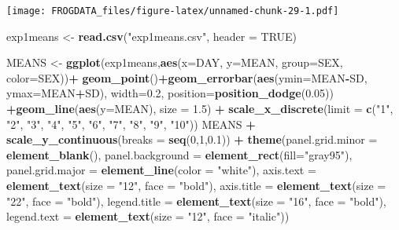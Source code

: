 \documentclass[]{article}
\newenvironment{Shaded}{\begin{snugshade}}{\end{snugshade}}
\newcommand{\KeywordTok}[1]{\textcolor[rgb]{0.13,0.29,0.53}{\textbf{#1}}}
\newcommand{\DataTypeTok}[1]{\textcolor[rgb]{0.13,0.29,0.53}{#1}}
\newcommand{\DecValTok}[1]{\textcolor[rgb]{0.00,0.00,0.81}{#1}}
\newcommand{\FloatTok}[1]{\textcolor[rgb]{0.00,0.00,0.81}{#1}}
\newcommand{\StringTok}[1]{\textcolor[rgb]{0.31,0.60,0.02}{#1}}
\newcommand{\OtherTok}[1]{\textcolor[rgb]{0.56,0.35,0.01}{#1}}
\newcommand{\OperatorTok}[1]{\textcolor[rgb]{0.81,0.36,0.00}{\textbf{#1}}}
\newcommand{\NormalTok}[1]{#1}
\begin{document}
\texttt{[image: FROGDATA\_files/figure-latex/unnamed-chunk-29-1.pdf]}

\begin{Shaded}
\begin{Highlighting}[]
\NormalTok{exp1means <-}\StringTok{ }\KeywordTok{read.csv}\NormalTok{(}\StringTok{"exp1means.csv"}\NormalTok{, }\DataTypeTok{header =} \OtherTok{TRUE}\NormalTok{)}

\NormalTok{MEANS <-}\StringTok{ }\KeywordTok{ggplot}\NormalTok{(exp1means,}\KeywordTok{aes}\NormalTok{(}\DataTypeTok{x=}\NormalTok{DAY, }\DataTypeTok{y=}\NormalTok{MEAN, }\DataTypeTok{group=}\NormalTok{SEX, }\DataTypeTok{color=}\NormalTok{SEX))}\OperatorTok{+}
\StringTok{  }\KeywordTok{geom_point}\NormalTok{()}\OperatorTok{+}\KeywordTok{geom_errorbar}\NormalTok{(}\KeywordTok{aes}\NormalTok{(}\DataTypeTok{ymin=}\NormalTok{MEAN}\OperatorTok{-}\NormalTok{SD, }\DataTypeTok{ymax=}\NormalTok{MEAN}\OperatorTok{+}\NormalTok{SD), }\DataTypeTok{width=}\FloatTok{0.2}\NormalTok{, }\DataTypeTok{position=}\KeywordTok{position_dodge}\NormalTok{(}\FloatTok{0.05}\NormalTok{)) }\OperatorTok{+}\KeywordTok{geom_line}\NormalTok{(}\KeywordTok{aes}\NormalTok{(}\DataTypeTok{y=}\NormalTok{MEAN), }\DataTypeTok{size =} \FloatTok{1.5}\NormalTok{) }\OperatorTok{+}\StringTok{ }\KeywordTok{scale_x_discrete}\NormalTok{(}\DataTypeTok{limit =} \KeywordTok{c}\NormalTok{(}\StringTok{"1"}\NormalTok{, }\StringTok{"2"}\NormalTok{, }\StringTok{"3"}\NormalTok{, }\StringTok{"4"}\NormalTok{, }\StringTok{"5"}\NormalTok{, }\StringTok{"6"}\NormalTok{, }\StringTok{"7"}\NormalTok{, }\StringTok{"8"}\NormalTok{, }\StringTok{"9"}\NormalTok{, }\StringTok{"10"}\NormalTok{))}
\NormalTok{MEANS }\OperatorTok{+}\StringTok{ }\KeywordTok{scale_y_continuous}\NormalTok{(}\DataTypeTok{breaks =} \KeywordTok{seq}\NormalTok{(}\DecValTok{0}\NormalTok{,}\DecValTok{1}\NormalTok{,}\FloatTok{0.1}\NormalTok{)) }\OperatorTok{+}\StringTok{ }\KeywordTok{theme}\NormalTok{(}\DataTypeTok{panel.grid.minor =} \KeywordTok{element_blank}\NormalTok{(), }\DataTypeTok{panel.background =} \KeywordTok{element_rect}\NormalTok{(}\DataTypeTok{fill=}\StringTok{"gray95"}\NormalTok{), }\DataTypeTok{panel.grid.major =} \KeywordTok{element_line}\NormalTok{(}\DataTypeTok{color =} \StringTok{"white"}\NormalTok{), }\DataTypeTok{axis.text =} \KeywordTok{element_text}\NormalTok{(}\DataTypeTok{size =} \StringTok{"12"}\NormalTok{, }\DataTypeTok{face =} \StringTok{"bold"}\NormalTok{), }\DataTypeTok{axis.title =} \KeywordTok{element_text}\NormalTok{(}\DataTypeTok{size =} \StringTok{"22"}\NormalTok{, }\DataTypeTok{face =} \StringTok{"bold"}\NormalTok{), }\DataTypeTok{legend.title =} \KeywordTok{element_text}\NormalTok{(}\DataTypeTok{size =} \StringTok{"16"}\NormalTok{, }\DataTypeTok{face =} \StringTok{"bold"}\NormalTok{), }\DataTypeTok{legend.text =} \KeywordTok{element_text}\NormalTok{(}\DataTypeTok{size =} \StringTok{"12"}\NormalTok{, }\DataTypeTok{face =} \StringTok{"italic"}\NormalTok{))}
\end{Highlighting}
\end{Shaded}
\end{document}
